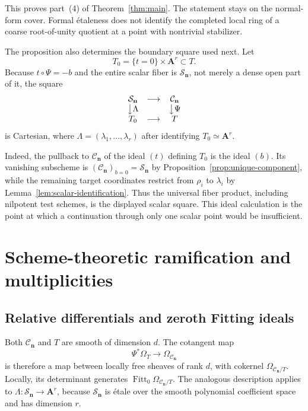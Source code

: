 \documentclass[11pt]{article}
\theoremstyle{definition}
\theoremstyle{remark}
\newcommand{\A}{\mathbf A}
\newcommand{\cC}{\mathcal C}
\newcommand{\cS}{\mathcal S}
\newcommand{\bn}{\mathbf n}
\newcommand{\Fitt}{\operatorname{Fitt}}
\begin{document}
This proves part~(4) of Theorem~\ref{thm:main}.  The statement stays on the
normal-form cover.  Formal étaleness does not identify the completed local
ring of a coarse root-of-unity quotient at a point with nontrivial
stabilizer.

The proposition also determines the boundary square used next.  Let
\[
  T_0=\{t=0\}\times\A^r\subset T.
\]
Because $t\circ\Psi=-b$ and the entire scalar fiber is $\cS_{\bn}$, not
merely a dense open part of it, the square
\begin{equation}
\label{eq:cartesian-square}
\begin{array}{ccc}
  \cS_{\bn}&\longrightarrow&\cC_{\bn}\\
  \big\downarrow{\Lambda}&&\big\downarrow{\Psi}\\
  T_0&\longrightarrow&T
\end{array}
\end{equation}
is Cartesian, where
$\Lambda=(\lambda_1,\ldots,\lambda_r)$ after identifying
$T_0\simeq\A^r$.

Indeed, the pullback to $\cC_{\bn}$ of the ideal $(t)$ defining $T_0$ is
the ideal $(b)$.  Its vanishing subscheme is
$(\cC_{\bn})_{b=0}=\cS_{\bn}$ by
Proposition~\ref{prop:unique-component}, while the remaining target
coordinates restrict from $\rho_i$ to $\lambda_i$ by
Lemma~\ref{lem:scalar-identification}.  Thus the universal fiber product,
including nilpotent test schemes, is the displayed scalar square.  This
ideal calculation is the point at which a continuation through only one
scalar point would be insufficient.

\section{Scheme-theoretic ramification and multiplicities}
\label{sec:fitting}

\subsection{Relative differentials and zeroth Fitting ideals}

Both $\cC_{\bn}$ and $T$ are smooth of dimension $d$.  The cotangent map
\[
  \Psi^*\Omega_T\longrightarrow\Omega_{\cC_{\bn}}
\]
is therefore a map between locally free sheaves of rank $d$, with cokernel
$\Omega_{\cC_{\bn}/T}$.  Locally, its determinant generates
$\Fitt_0\Omega_{\cC_{\bn}/T}$.  The analogous description applies to
$\Lambda:\cS_{\bn}\to\A^r$, because $\cS_{\bn}$ is étale over the smooth
polynomial coefficient space and has dimension $r$.
\end{document}
